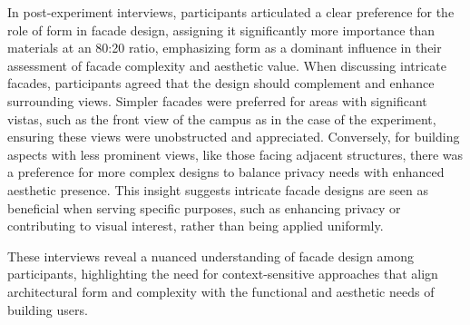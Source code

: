In post-experiment interviews, participants articulated a clear preference for the role of form in facade design, assigning it significantly more importance than materials at an 80:20 ratio, emphasizing form as a dominant influence in their assessment of facade complexity and aesthetic value.
When discussing intricate facades, participants agreed that the design should complement and enhance surrounding views.
Simpler facades were preferred for areas with significant vistas, such as the front view of the campus as in the case of the experiment, ensuring these views were unobstructed and appreciated.
Conversely, for building aspects with less prominent views, like those facing adjacent structures, there was a preference for more complex designs to balance privacy needs with enhanced aesthetic presence.
This insight suggests intricate facade designs are seen as beneficial when serving specific purposes, such as enhancing privacy or contributing to visual interest, rather than being applied uniformly.

These interviews reveal a nuanced understanding of facade design among participants, highlighting the need for context-sensitive approaches that align architectural form and complexity with the functional and aesthetic needs of building users.










